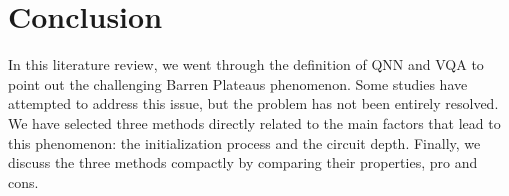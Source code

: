 \section{Conclusion}
In this literature review, we went through the definition of QNN and VQA to point out the challenging Barren Plateaus phenomenon. 
Some studies have attempted to address this issue, but the problem has not been entirely resolved.
We have selected three methods directly related to the main factors that lead to this phenomenon: the initialization process and the circuit depth.
Finally, we discuss the three methods compactly by comparing their properties, pro and cons.
